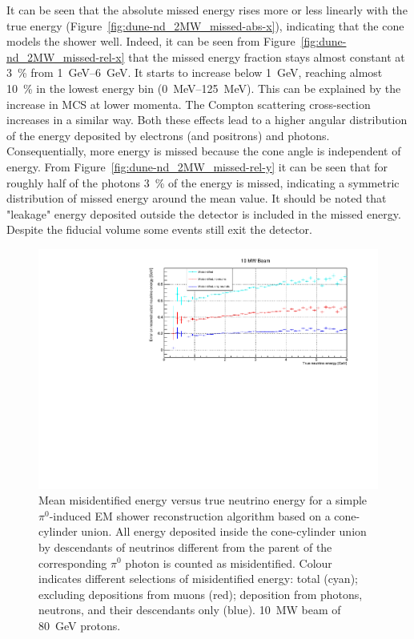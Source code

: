 \documentclass[a4paper]{article}
\begin{document}
It can be seen that the absolute missed energy rises more or less linearly with the true energy (Figure~\ref{fig:dune-nd_2MW_missed-abs-x}), indicating that the cone models the shower well.
Indeed, it can be seen from Figure~\ref{fig:dune-nd_2MW_missed-rel-x} that the missed energy fraction stays almost constant at \SI{3}{\percent} from \SIrange{1}{6}{\giga\electronvolt}.
It starts to increase below \SI{1}{\giga\electronvolt}, reaching almost \SI{10}{\percent} in the lowest energy bin (\SIrange{0}{125}{\mega\electronvolt}).
This can be explained by the increase in MCS at lower momenta.
The Compton scattering cross-section increases in a similar way.
Both these effects lead to a higher angular distribution of the energy deposited by electrons (and positrons) and photons.
Consequentially, more energy is missed because the cone angle is independent of energy.
From Figure~\ref{fig:dune-nd_2MW_missed-rel-y} it can be seen that for roughly half of the photons \SI{3}{\percent} of the energy is missed, indicating a symmetric distribution of missed energy around the mean value.
It should be noted that "leakage" energy deposited outside the detector is included in the missed energy.
Despite the fiducial volume some events still exit the detector.

\begin{figure}[tbp]
	\centering
	\includegraphics[width=\textwidth]{Figures/10MW/misid_abs_x}
	\caption[Pile-up study mean misidentified vs.\ true neutrino energy, \SI{10}{\mega\watt} beam]{%
		Mean misidentified energy versus true neutrino energy for a simple $\pi^0$-induced EM shower reconstruction algorithm based on a cone-cylinder union.
		All energy deposited inside the cone-cylinder union by descendants of neutrinos different from the parent of the corresponding $\pi^0$ photon is counted as misidentified.
		Colour indicates different selections of misidentified energy: total (cyan); excluding depositions from muons (red); deposition from photons, neutrons, and their descendants only (blue).
		\SI{10}{\mega\watt} beam of \SI{80}{\giga\electronvolt} protons.
	}
	\label{fig:dune-nd_10MW_misid-abs-x}
\end{figure}
\end{document}
